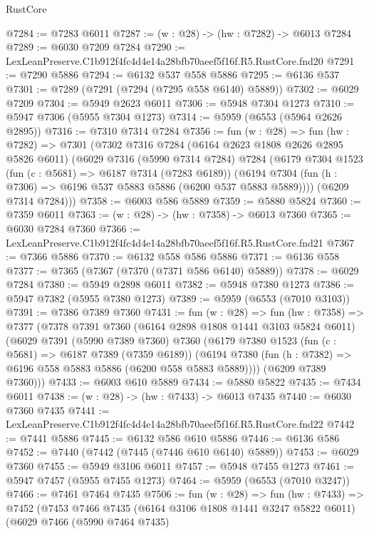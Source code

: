 \begin{lexlean}{RustCore}
\begin{coremodule}
@7284 := @7283 @6011
@7287 := (w : @28) -> (hw : @7282) -> @6013 @7284
@7289 := @6030 @7209 @7284
@7290 := LexLeanPreserve.C1b912f4fc4d4e14a28bfb70aeef5f16f.R5.RustCore.fnd20
@7291 := @7290 @5886
@7294 := @6132 @537 @558 @5886
@7295 := @6136 @537
@7301 := @7289 (@7291 (@7294 (@7295 @558 @6140) @5889))
@7302 := @6029 @7209
@7304 := @5949 @2623 @6011
@7306 := @5948 @7304 @1273
@7310 := @5947 @7306 (@5955 @7304 @1273)
@7314 := @5959 (@6553 (@5964 @2626 @2895))
@7316 := @7310 @7314 @7284
@7356 := fun (w : @28) =>
  fun (hw : @7282) =>
  @7301
    (@7302
      @7316
      @7284
      (@6164 @2623 @1808 @2626 @2895 @5826 @6011)
      (@6029
        @7316
        (@5990 @7314 @7284)
        @7284
        (@6179
          @7304
          @1523
          (fun (c : @5681) => @6187 @7314 (@7283 @6189))
          (@6194 @7304 (fun (h : @7306) => @6196 @537 @5883 @5886 (@6200 @537 @5883 @5889))))
        (@6209 @7314 @7284)))
@7358 := @6003 @586 @5889
@7359 := @5880 @5824
@7360 := @7359 @6011
@7363 := (w : @28) -> (hw : @7358) -> @6013 @7360
@7365 := @6030 @7284 @7360
@7366 := LexLeanPreserve.C1b912f4fc4d4e14a28bfb70aeef5f16f.R5.RustCore.fnd21
@7367 := @7366 @5886
@7370 := @6132 @558 @586 @5886
@7371 := @6136 @558
@7377 := @7365 (@7367 (@7370 (@7371 @586 @6140) @5889))
@7378 := @6029 @7284
@7380 := @5949 @2898 @6011
@7382 := @5948 @7380 @1273
@7386 := @5947 @7382 (@5955 @7380 @1273)
@7389 := @5959 (@6553 (@7010 @3103))
@7391 := @7386 @7389 @7360
@7431 := fun (w : @28) =>
  fun (hw : @7358) =>
  @7377
    (@7378
      @7391
      @7360
      (@6164 @2898 @1808 @1441 @3103 @5824 @6011)
      (@6029
        @7391
        (@5990 @7389 @7360)
        @7360
        (@6179
          @7380
          @1523
          (fun (c : @5681) => @6187 @7389 (@7359 @6189))
          (@6194 @7380 (fun (h : @7382) => @6196 @558 @5883 @5886 (@6200 @558 @5883 @5889))))
        (@6209 @7389 @7360)))
@7433 := @6003 @610 @5889
@7434 := @5880 @5822
@7435 := @7434 @6011
@7438 := (w : @28) -> (hw : @7433) -> @6013 @7435
@7440 := @6030 @7360 @7435
@7441 := LexLeanPreserve.C1b912f4fc4d4e14a28bfb70aeef5f16f.R5.RustCore.fnd22
@7442 := @7441 @5886
@7445 := @6132 @586 @610 @5886
@7446 := @6136 @586
@7452 := @7440 (@7442 (@7445 (@7446 @610 @6140) @5889))
@7453 := @6029 @7360
@7455 := @5949 @3106 @6011
@7457 := @5948 @7455 @1273
@7461 := @5947 @7457 (@5955 @7455 @1273)
@7464 := @5959 (@6553 (@7010 @3247))
@7466 := @7461 @7464 @7435
@7506 := fun (w : @28) =>
  fun (hw : @7433) =>
  @7452
    (@7453
      @7466
      @7435
      (@6164 @3106 @1808 @1441 @3247 @5822 @6011)
      (@6029
        @7466
        (@5990 @7464 @7435)

\end{coremodule}
\end{lexlean}
